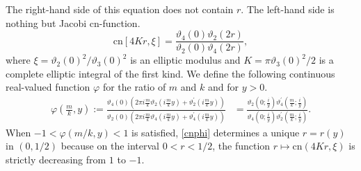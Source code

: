 \documentclass[10pt,leqno]{amsart}
\numberwithin{equation}{section}
\begin{document}
The right-hand side of this equation does not contain $r$. The left-hand side is nothing but Jacobi $\mathrm{cn}$-function.
\begin{equation}%
\mathrm{cn}\left[4Kr,\xi\right]=\frac{\vartheta_4\left(0\right)\vartheta_2\left(2r\right)}{\vartheta_2\left(0\right)\vartheta_4\left(2r\right)},
\end{equation}
where $\xi=\vartheta_2\left(0\right)^2/\vartheta_3\left(0\right)^2$ is an elliptic modulus and $K=\pi\vartheta_3\left(0\right)^2/2$ is a complete elliptic integral of the first kind.
We define the following continuous real-valued function $\varphi$ for the ratio of $m$ and $k$ and for $y>0$.
\begin{equation}
\begin{split}
\varphi\left(\frac{m}{k},y\right):=\frac{\vartheta_4\left(0\right)\left(2\pi i\frac{m}{k}\vartheta_2\left(i\frac{m}{k}y\right)+\vartheta_2^{'}\left(i\frac{m}{k}y\right)\right)}{\vartheta_2\left(0\right)\left(2\pi i\frac{m}{k}\vartheta_4\left(i\frac{m}{k}y\right)+\vartheta_4^{'}\left(i\frac{m}{k}y\right)\right)}
&=\frac{\vartheta_2\left(0;\frac{i}{y}\right)\vartheta_4^{'}\left(\frac{m}{k};\frac{i}{y}\right)}{\vartheta_4\left(0;\frac{i}{y}\right)\vartheta_2^{'}\left(\frac{m}{k};\frac{i}{y}\right)}.
\end{split}
\end{equation}
When $-1<\varphi\left(m/k,y\right)<1$ is satisfied, 
\eqref{cnphi} determines a unique $r=r(y)$ in $(0,1/2)$
 because on the interval $0<r<1/2$, the function
$r\mapsto \mathrm{cn}(4Kr,\xi)$ is strictly decreasing from $1$ to $-1$.

\end{document}
